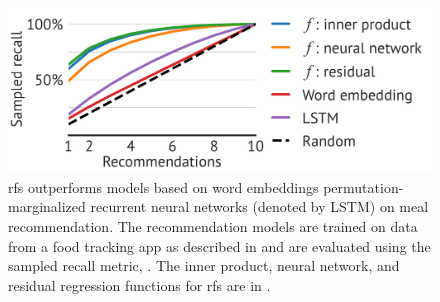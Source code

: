 \begin{figure}[!tb]
  \centering
  \includegraphics[width=0.95\linewidth]{fig/meal-recall}
  \caption{\acrlong{rfs} outperforms models based on word embeddings
    permutation-marginalized recurrent neural networks (denoted by LSTM) on meal
    recommendation. The recommendation models are trained on data from a food
    tracking app as described in  and are evaluated
    using the sampled recall metric, . The inner
    product, neural network, and residual regression functions for \acrlong{rfs}
    are in .}
  \label{fig:meal-recall}
\end{figure}

